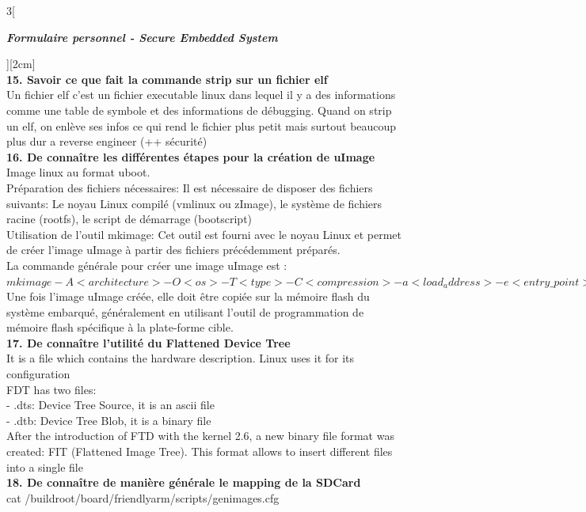 \begin{multicols}{3}[\centerline{ \large\em \textbf{Formulaire personnel - Secure Embedded System}}][2cm]
\\ \textbf{15. Savoir ce que fait la commande strip sur un fichier elf\\}
Un fichier elf c'est un fichier executable linux dans lequel il y a des informations comme une table de symbole et des informations de débugging. Quand on strip un elf, on enlève ses infos ce qui rend le fichier plus petit mais surtout beaucoup plus dur a reverse engineer (++ sécurité)
\\ \textbf{16. De connaître les différentes étapes pour la création de uImage\\}
Image linux au format uboot.\\
Préparation des fichiers nécessaires: Il est nécessaire de disposer des fichiers suivants: Le noyau Linux compilé (vmlinux ou zImage), le système de fichiers racine (rootfs), le script de démarrage (bootscript)\\
Utilisation de l'outil mkimage: Cet outil est fourni avec le noyau Linux et permet de créer l'image uImage à partir des fichiers précédemment préparés. \\
La commande générale pour créer une image uImage est :\\
$mkimage -A <architecture> -O <os> -T <type> -C <compression> -a <load_address> -e <entry\_ point> -n <image\_name> -d <image\_file> <uImage\_file>$\\
Une fois l'image uImage créée, elle doit être copiée sur la mémoire flash du système embarqué, généralement en utilisant l'outil de programmation de mémoire flash spécifique à la plate-forme cible. 
\\ \textbf{17. De connaître l’utilité du Flattened Device Tree\\}
It is a file which contains the hardware description. Linux uses it for its configuration\\
FDT has two files:\\
- .dts: Device Tree Source, it is an ascii file\\
- .dtb: Device Tree Blob, it is a binary file\\
After the introduction of FTD with the kernel 2.6, a new binary file format was created: FIT (Flattened Image Tree).  This format allows to insert different files into a single file
\\ \textbf{18. De connaître de manière générale le mapping de la SDCard\\}
cat /buildroot/board/friendlyarm/scripts/genimages.cfg\\


\end{multicols}
